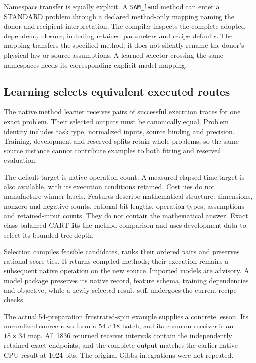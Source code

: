 Namespace transfer is equally explicit. A \texttt{SAM\_land} method can enter a STANDARD problem through a declared method-only mapping naming the donor and recipient interpretation. The compiler inspects the complete adopted dependency closure, including retained parameters and recipe defaults. The mapping transfers the specified method; it does not silently rename the donor's physical law or source assumptions. A learned selector crossing the same namespaces needs its corresponding explicit model mapping.

\subsection{Learning selects equivalent executed routes}
\label{v3-runtime-route-learning}

The native method learner receives pairs of successful execution traces for one exact problem. Their selected outputs must be canonically equal. Problem identity includes task type, normalized inputs, source binding and precision. Training, development and reserved splits retain whole problems, so the same source instance cannot contribute examples to both fitting and reserved evaluation.

The default target is native operation count. A measured elapsed-time target is also available, with its execution conditions retained. Cost ties do not manufacture winner labels. Features describe mathematical structure: dimensions, nonzero and negative counts, rational bit lengths, operation types, assumptions and retained-input counts. They do not contain the mathematical answer. Exact class-balanced CART fits the method comparison and uses development data to select its bounded tree depth.

Selection compiles feasible candidates, ranks their ordered pairs and preserves rational score ties. It returns compiled methods; their execution remains a subsequent native operation on the new source. Imported models are advisory. A model package preserves its native record, feature schema, training dependencies and objective, while a newly selected result still undergoes the current recipe checks.

The actual 54-preparation frustrated-spin example supplies a concrete lesson. Its normalized source rows form a $54\times18$ batch, and its common receiver is an $18\times34$ map. All 1836 returned receiver intervals contain the independently retained exact endpoints, and the complete output matches the earlier native CPU result at 1024 bits. The original Gibbs integrations were not repeated.


